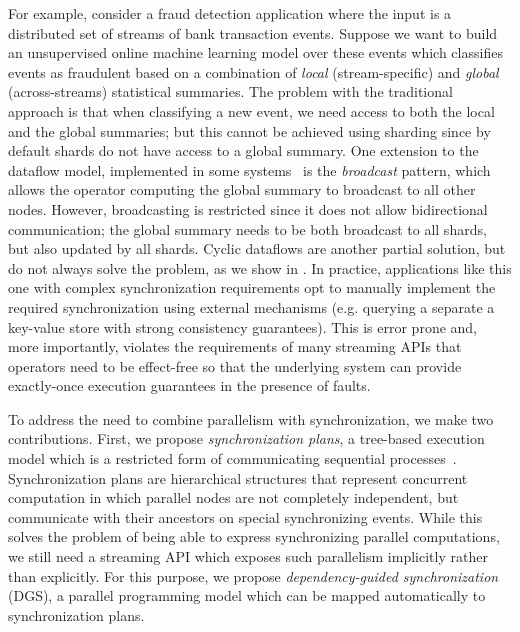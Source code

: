 For example, consider a fraud detection application where the input is a distributed set of streams of bank transaction events. Suppose we want to build an unsupervised online machine learning model over these events which classifies events as fraudulent based on a combination of \emph{local} (stream-specific) and \emph{global} (across-streams) statistical summaries.
The problem with the traditional approach is that when classifying a new event, we need access to both the local and the global summaries; but this cannot be achieved using sharding since by default shards do not have access to a global summary.
One extension to the dataflow model, implemented in some systems~\cite{Flink,Timely} is the \emph{broadcast} pattern, which allows the operator computing the global summary to broadcast to all other nodes.
However, broadcasting is restricted since it does not allow bidirectional communication;
the global summary needs to be both broadcast to all shards, but also updated by all shards.
Cyclic dataflows are another partial solution, but do not always solve the problem, as we show in .
In practice, applications like this one with complex synchronization requirements opt to  manually
implement the required synchronization using
external mechanisms (e.g. querying a separate a key-value store with strong consistency guarantees). This is error prone and, more importantly, violates the requirements of many streaming APIs that operators need to be effect-free so that the underlying system can provide exactly-once execution guarantees in the presence of faults.

To address the need to combine parallelism with synchronization, we make two contributions. First, we propose \emph{synchronization plans}, a tree-based execution model which is a restricted form of communicating sequential processes~\cite{hoare1978communicating}.
Synchronization plans are hierarchical structures that represent concurrent computation in which parallel nodes are not completely independent, but communicate with their ancestors on special synchronizing events.
While this solves the problem of being able to express synchronizing parallel computations, we still need a streaming API which exposes such parallelism implicitly rather than explicitly.
For this purpose, we propose \emph{dependency-guided synchronization} (DGS), a parallel programming model which can be mapped automatically to synchronization plans.


